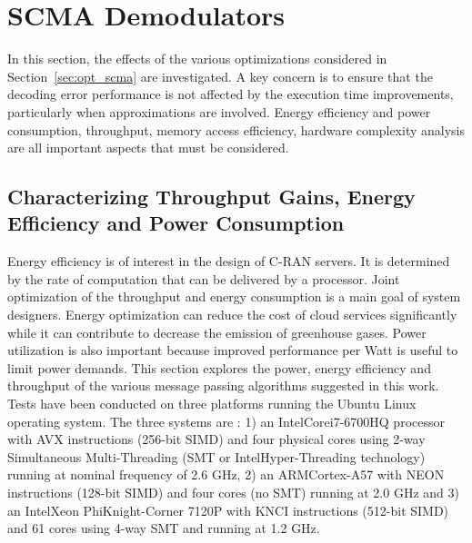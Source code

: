 \section{SCMA Demodulators}
\label{sec:eval_scma}

In this section, the effects of the various optimizations considered in
Section~\ref{sec:opt_scma} are investigated. A key concern is to ensure that the
decoding error performance is not affected by the execution time improvements,
particularly when approximations are involved. Energy efficiency and power
consumption, throughput, memory access efficiency, hardware complexity analysis
are all important aspects that must be considered.

\subsection{Characterizing Throughput Gains, Energy Efficiency and Power Consumption}
\label{sec:eval_scma_throughput}

Energy efficiency is of interest in the design of C-RAN servers. It is
determined by the rate of computation that can be delivered by a processor.
Joint optimization of the throughput and energy consumption is a main goal of
system designers. Energy optimization can reduce the cost of cloud services
significantly while it can contribute to decrease the emission of greenhouse
gases. Power utilization is also important because improved performance per Watt
is useful to limit power demands. This section explores the power, energy
efficiency and throughput of the various message passing algorithms suggested in
this work. Tests have been conducted on three platforms running the Ubuntu Linux
operating system. The three systems are : 1) an Intel\R Core\TM i7-6700HQ
processor with AVX instructions (256-bit SIMD) and four physical cores using
2-way Simultaneous Multi-Threading (SMT or Intel\R Hyper-Threading technology)
running at nominal frequency of 2.6 GHz, 2) an ARM\R Cortex-A57 with NEON
instructions (128-bit SIMD) and four cores (no SMT) running at 2.0 GHz and 3) an
Intel\R Xeon Phi\TM Knight-Corner 7120P with KNCI instructions (512-bit SIMD)
and 61 cores using 4-way SMT and running at 1.2 GHz.

